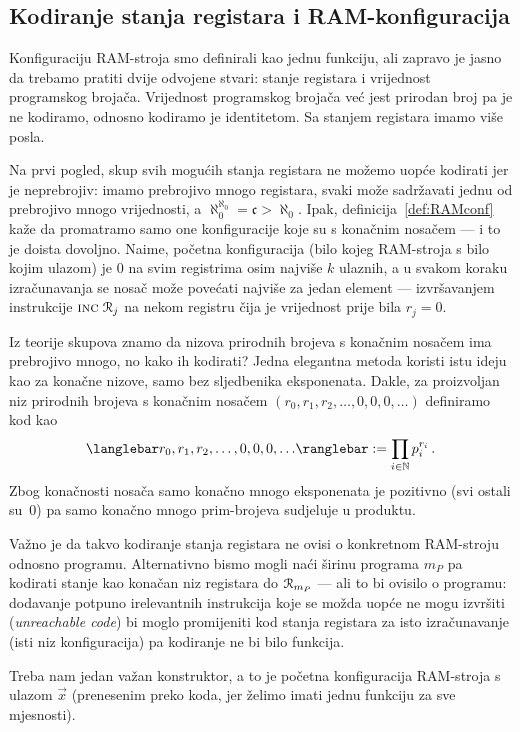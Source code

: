 \subsection{Kodiranje stanja registara i RAM-konfiguracija}

Konfiguraciju RAM-stroja smo definirali kao jednu funkciju, ali zapravo je jasno da trebamo pratiti dvije odvojene stvari: stanje registara i vrijednost programskog brojača. Vrijednost programskog brojača već jest prirodan broj pa je ne kodiramo, odnosno kodiramo je identitetom. Sa stanjem registara imamo više posla.

Na prvi pogled, skup svih mogućih stanja registara ne možemo uopće kodirati jer je neprebrojiv: imamo prebrojivo mnogo registara, svaki može sadržavati jednu od prebrojivo mnogo vrijednosti, a $\aleph_0^{\aleph_0}=\mathfrak c>\aleph_0$. Ipak, definicija~\ref{def:RAMconf} kaže da promatramo samo one konfiguracije koje su s konačnim nosačem --- i to je doista dovoljno. Naime, početna konfiguracija (bilo kojeg RAM-stroja s bilo kojim ulazom) je $0$ na svim registrima osim najviše $k$ ulaznih, a u svakom koraku izračunavanja se nosač može povećati najviše za jedan element --- izvršavanjem instrukcije $\textsc{inc}\;\mathcal R_{j}$ na nekom registru čija je vrijednost prije bila $r_j=0$.

Iz teorije skupova znamo da nizova prirodnih brojeva s konačnim nosačem ima prebrojivo mnogo, no kako ih kodirati? Jedna elegantna metoda koristi istu ideju kao za konačne nizove, samo bez sljedbenika eksponenata. Dakle, za proizvoljan niz prirodnih brojeva s konačnim nosačem $(r_0,r_1,r_2,\dotsc,0,0,0,\dotsc)$ definiramo kod kao
\begin{equation}\label{eq:defkreg}
    \knk{r_0,r_1,r_2,\dotsc,0,0,0,\dotsc}:=\prod_{i\in\N}p_i^{r_i}\,\text.
\end{equation}
Zbog konačnosti nosača samo konačno mnogo eksponenata je pozitivno (svi ostali su~$0$) pa samo konačno mnogo prim-brojeva sudjeluje u produktu.

Važno je da takvo kodiranje stanja registara ne ovisi o konkretnom RAM-stroju odnosno programu. Alternativno bismo mogli naći širinu programa $m_P$ pa kodirati stanje kao konačan niz registara do $\mathcal R_{m_P}$ --- ali to bi ovisilo o programu: dodavanje potpuno irelevantnih instrukcija koje se možda uopće ne mogu izvršiti (\emph{unreachable code}) bi moglo promijeniti kod stanja registara za isto izračunavanje (isti niz konfiguracija) pa kodiranje ne bi bilo funkcija.

Treba nam jedan važan konstruktor, a to je %
početna konfiguracija RAM-stroja s ulazom $\vec x$ (prenesenim preko koda, jer želimo imati jednu funkciju za sve mjesnosti).

